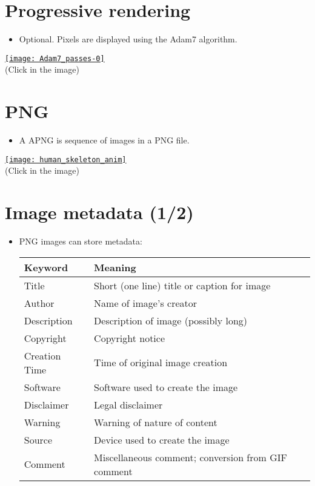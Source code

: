 \section{Progressive rendering}
\begin{itemize}
\item Optional. Pixels are displayed using the Adam7 algorithm.
\end{itemize}
\begin{center}
  \href{https://upload.wikimedia.org/wikipedia/commons/2/27/Adam7_passes.gif}{\texttt{[image: Adam7\_passes-0]}} \\
  (Click in the image)
\end{center}
  
\section{ PNG}
\begin{itemize}
\item A \gls{APNG} is sequence of images in a \gls{PNG} file.
\end{itemize}
\begin{center}
  \href{https://commons.wikimedia.org/wiki/Category:Animated_PNG_files#/media/File:201805_human_skeleton_anim.png}{\texttt{[image: human\_skeleton\_anim]}} \\
  (Click in the image)
\end{center}

\section{Image metadata (1/2)}
\begin{itemize}
\item \gls{PNG} images can store metadata:
  \begin{center}
    \begin{tabular}{l|l}
      Keyword & Meaning\\
      \hline
      Title & Short (one line) title or caption for image \\
      Author & Name of image's creator \\
      Description & Description of image (possibly long) \\
      Copyright & Copyright notice \\
      Creation Time & Time of original image creation \\
      Software & Software used to create the image \\
      Disclaimer & Legal disclaimer \\
      Warning & Warning of nature of content \\
      Source & Device used to create the image \\
      Comment & Miscellaneous comment; conversion from GIF comment
    \end{tabular}
  \end{center}
\end{itemize}

